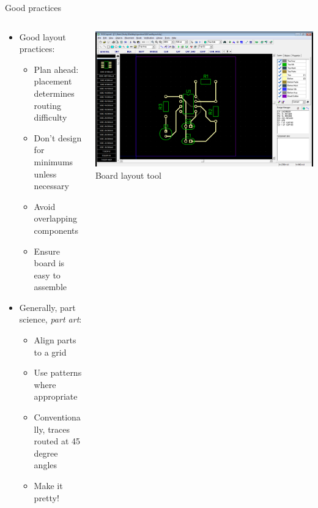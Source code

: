 \documentclass{beamer}
\begin{document}
\begin{frame}{Good practices}
  \begin{columns}[T]
    \begin{column}{.6\textwidth}
      \begin{itemize}
        \item Good layout practices:
        \begin{itemize}
          \item Plan ahead: placement determines routing difficulty
          \item Don't design for minimums unless necessary
          \item Avoid overlapping components
          \item Ensure board is easy to assemble
        \end{itemize}
        \item Generally, part science, {\em part art}:
        \begin{itemize}
          \item Align parts to a grid
          \item Use patterns where appropriate
          \item Conventionally, traces routed at 45 degree angles
          \item Make it pretty!
        \end{itemize}
      \end{itemize}
    \end{column}

    \begin{column}{0.4\textwidth} \centering
      \includegraphics[width=0.9\columnwidth]{../images/diptrace/555_layout} \\
      Board layout tool
    \end{column}
  \end{columns}
\end{frame}
\end{document}
